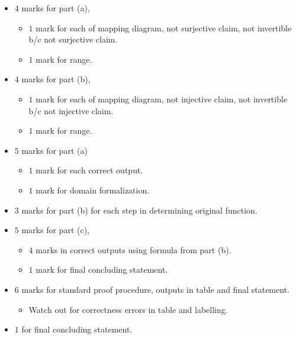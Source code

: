 \documentclass[12pt]{article} %
\begin{document}
\begin{qstn} 
  \begin{itemize}
    \item $4$ marks for part (a),
      \begin{itemize}
        \item  $1$ mark for each of mapping diagram, not surjective claim, not invertible b/c not surjective claim.
        \item $1$ mark for range.
      \end{itemize}
    \item $4$ marks for part (b),
      \begin{itemize}
        \item  $1$ mark for each of mapping diagram, not injective claim, not invertible b/c not injective claim.
        \item $1$ mark for range.
      \end{itemize}
  \end{itemize}
\end{qstn}

\begin{qstn} 
  \begin{itemize}
    \item $5$ marks for part (a)
      \begin{itemize}
        \item  $1$ mark for each correct output.
        \item $1$ mark for domain formalization.
      \end{itemize}
    \item $3$ marks for part (b) for each step in determining original function.
    \item $5$ marks for part (c),
      \begin{itemize}
        \item $4$ marks in correct outputs using formula from part (b).
        \item $1$ mark for final concluding statement.
      \end{itemize}
  \end{itemize}
\end{qstn}

\begin{qstn} 
  \begin{itemize}
    \item $6$ marks for standard proof procedure, outputs in table and final statement.
      \begin{itemize}
        \item Watch out for correctness errors in table and labelling.
      \end{itemize}
    \item $1$ for final concluding statement.
  \end{itemize}
\end{qstn}
\end{document}
